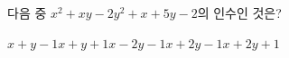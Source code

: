 다음 중 $x^2+xy-2y^2+x+5y-2$의 인수인 것은?
\begin{choices32}{$x+y-1$}{$x+y+1$}{$x-2y-1$}{$x+2y-1$}{$x+2y+1$}\end{choices32}
